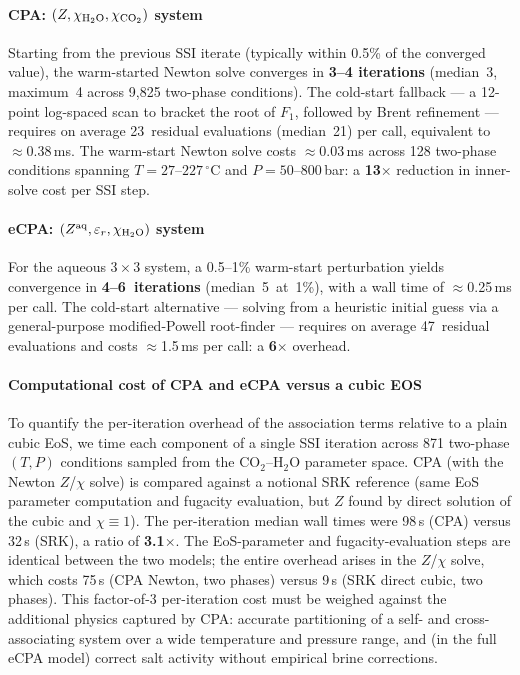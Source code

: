 \documentclass[preprint,12pt,number]{elsarticle}
\begin{document}
\paragraph{CPA: $(Z, \chi_{\rm H_2O}, \chi_{\rm CO_2})$ system}
Starting from the previous SSI iterate (typically within 0.5\% of the converged
value), the warm-started Newton solve converges in \textbf{3--4 iterations}
(median~3, maximum~4 across 9{,}825 two-phase conditions).
The cold-start fallback — a 12-point log-spaced scan to bracket the root of $F_1$,
followed by Brent refinement — requires on average 23~residual evaluations
(median~21) per call, equivalent to $\approx$0.38\,ms.
The warm-start Newton solve costs $\approx$0.03\,ms across 128 two-phase conditions
spanning $T = 27$--$227\,^\circ$C and $P = 50$--$800$\,bar:
a \textbf{13$\times$} reduction in inner-solve cost per SSI step.

\paragraph{eCPA: $(Z^{\rm aq}, \varepsilon_r, \chi_{\rm H_2O})$ system}
For the aqueous $3\times 3$ system, a 0.5--1\% warm-start perturbation yields
convergence in \textbf{4--6~iterations} (median~5~at~1\%), with a wall time of
$\approx$0.25\,ms per call.
The cold-start alternative — solving from a heuristic initial guess via a
general-purpose modified-Powell root-finder — requires on average 47~residual
evaluations and costs $\approx$1.5\,ms per call: a \textbf{6$\times$} overhead.

\paragraph{Computational cost of CPA and eCPA versus a cubic EOS}
To quantify the per-iteration overhead of the association terms relative to a plain
cubic EoS, we time each component of a single SSI iteration across 871 two-phase
$(T, P)$ conditions sampled from the CO$_2$--H$_2$O parameter space.
CPA (with the Newton $Z$/$\chi$ solve) is compared against a notional SRK reference
(same EoS parameter computation and fugacity evaluation, but $Z$ found by direct
solution of the cubic and $\chi \equiv 1$).
The per-iteration median wall times were 98\,\textmu{}s (CPA) versus 32\,\textmu{}s
(SRK), a ratio of \textbf{3.1$\times$}.
The EoS-parameter and fugacity-evaluation steps are identical between the two models;
the entire overhead arises in the $Z$/$\chi$ solve, which costs 75\,\textmu{}s
(CPA Newton, two phases) versus 9\,\textmu{}s (SRK direct cubic, two phases).
This factor-of-3 per-iteration cost must be weighed against the additional physics
captured by CPA: accurate partitioning of a self- and cross-associating system over
a wide temperature and pressure range, and (in the full eCPA model) correct salt
activity without empirical brine corrections.
\end{document}
